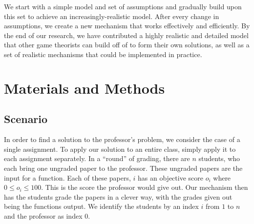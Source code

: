 \documentclass[12pt, Arial]{article}
\begin{document}
We start with a simple model and set of assumptions and gradually build upon this set to achieve an increasingly-realistic model. After every change in assumptions, we create a new mechanism that works effectively and efficiently. By the end of our research, we have contributed a highly realistic and detailed model that other game theorists can build off of to form their own solutions, as well as a set of realistic mechanisms that could be implemented in practice.
\section{Materials and Methods}
\subsection{Scenario}
In order to find a solution to the professor's problem, we consider the case of a single assignment. To apply our solution to an entire class, simply apply it to each assignment separately. In a ``round'' of grading, there are $n$ students, who each bring one ungraded paper to the professor. These ungraded papers are the input for a function. Each of these papers, $i$ has an objective score $o_i$ where $0\leq o_i \leq 100$. This is the score the professor would give out. Our mechanism then has the students grade the papers in a clever way, with the grades given out being the functions output. We identify the students by an index $i$ from $1$ to $n$ and the professor as index $0$.
\end{document}
